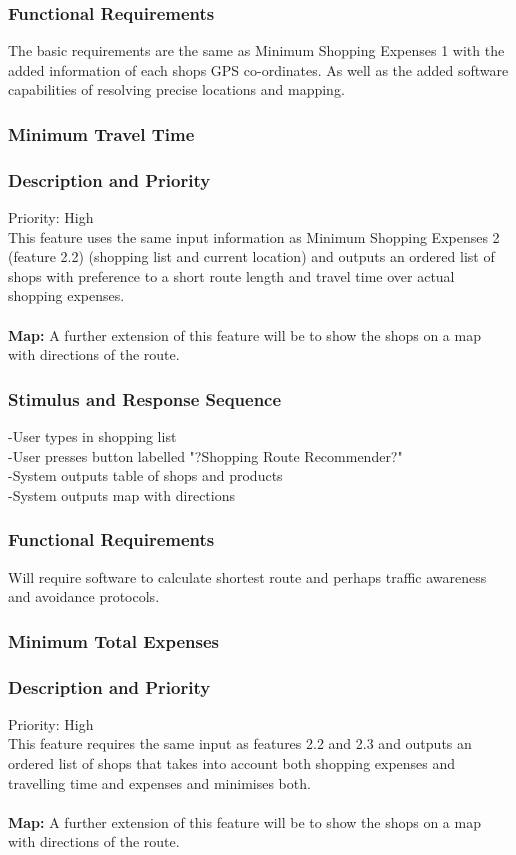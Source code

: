 \documentclass[12pt]{article}
\begin{document}
 \subsubsection*{Functional Requirements}
 The basic requirements are the same as Minimum Shopping Expenses 1 with the added information of each shops GPS co-ordinates. As well as the added software capabilities of resolving precise locations and mapping.
 
 \subsubsection{Minimum Travel Time}
\subsubsection*{Description and Priority}
 Priority: High\\
 This feature uses the same input information as Minimum Shopping Expenses 2 (feature 2.2) (shopping list and current location) and outputs an ordered list of shops with preference to a short route length and travel time over actual shopping expenses.  
\\\\
\textbf{Map:} A further extension of this feature will be to show the shops on a map with directions of the route.
 \subsubsection*{Stimulus and Response Sequence}
-User types in shopping list\\
-User presses button labelled "?Shopping Route Recommender?"\\
-System outputs table of shops and products\\
-System outputs map with directions\\ 
\subsubsection*{Functional Requirements}
Will require software to calculate shortest route and perhaps traffic awareness and avoidance  protocols.
 
 \subsubsection{Minimum Total Expenses}
\subsubsection*{Description and Priority}
 Priority: High\\
 This feature requires the same input as features 2.2 and 2.3 and outputs an ordered list of shops that takes into account both shopping expenses and travelling time and expenses and minimises both. 
 \\\\
\textbf{Map:} A further extension of this feature will be to show the shops on a map with directions of the route.
\end{document}
